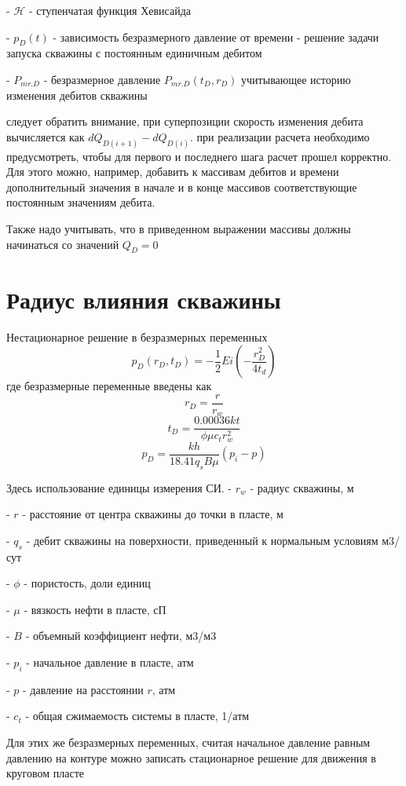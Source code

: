 \documentclass[oneside, openany]{memoir}
\begin{document}
	- $\mathcal{H}$ - ступенчатая функция Хевисайда
	
	- $p_D\left(t\right)$ - зависимость безразмерного давление от времени - решение задачи запуска скважины с постоянным единичным дебитом
	
	- $P_{mr.D} $ - безразмерное давление $P_{mr.D}(t_D, r_D)$ учитывающее историю изменения дебитов скважины
	
	следует обратить внимание, при суперпозиции скорость изменения дебита вычисляется как $dQ_{D(i+1)} - dQ_{D(i)}$.  при реализации расчета необходимо предусмотреть, чтобы для первого и последнего шага расчет прошел корректно. Для этого можно, например, добавить к массивам дебитов и времени дополнительный значения в начале и в конце массивов соответствующие постоянным значениям дебита. 
	
	Также надо учитывать, что в приведенном выражении массивы должны начинаться со значений $Q_D=0$
	
	\section{Радиус влияния скважины}
	
	
	Нестационарное решение в безразмерных переменных
	$$ 
	p_D(r_D,t_D) = - \frac{1}{2} Ei \left(- \dfrac{ r_D^2}{4t_d} \right)
	$$
	где безразмерные переменные введены как
	$$ r_D = \frac{r}{r_w}  $$
	$$ t_D = \frac{0.00036 kt}{\phi \mu c_t r_w^2}  $$
	$$ p_D = \frac{kh}{ 18.41 q_s B \mu} \left( p_i - p \right)   $$
	
	Здесь использование единицы измерения СИ.
	- $r_w$ - радиус скважины, м
	
	- $r$ - расстояние от центра скважины до точки в пласте, м
	
	- $q_s$ - дебит скважины на поверхности, приведенный к нормальным условиям м3/сут
	
	- $\phi$ - пористость, доли единиц
	
	- $\mu$ - вязкость нефти в пласте, сП
	
	- $B$ - объемный коэффициент нефти, м3/м3
	
	- $p_i$ - начальное давление в пласте, атм
	
	- $p$ - давление на расстоянии $r$, атм
	
	- $c_t$ - общая сжимаемость системы в пласте, 1/атм
	
	Для этих же безразмерных переменных, считая начальное давление равным давлению на контуре можно записать стационарное решение для движения в круговом пласте
	
\end{document}
